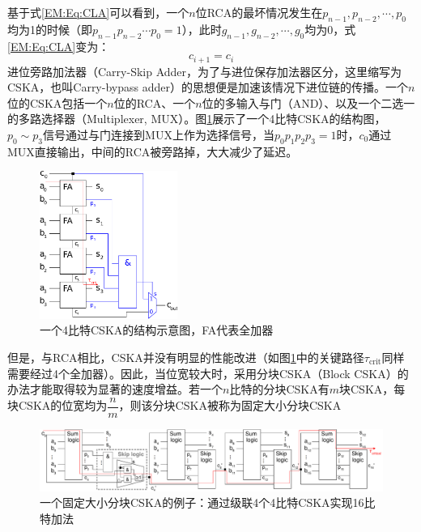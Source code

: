 基于式\eqref{EM:Eq:CLA}可以看到，一个$n$位RCA的最坏情况发生在$p_{n-1}, p_{n-2}, \cdots, p_0$均为1的时候（即$p_{n-1} p_{n-2} \cdots p_0=1$），此时$g_{n-1}, g_{n-2}, \cdots, g_0$均为0，式\eqref{EM:Eq:CLA}变为：
\begin{equation}
    c_{i+1} =  c_i
\label{EM:Eq:CSKA_prop}
\end{equation}
进位旁路加法器（Carry-Skip Adder，为了与进位保存加法器区分，这里缩写为CSKA，也叫Carry-bypass adder）的思想便是加速该情况下进位链的传播。一个$n$位的CSKA包括一个$n$位的RCA、一个$n$位的多输入与门（AND）、以及一个二选一的多路选择器（Multiplexer, MUX）。图\ref{EM:Fig:CSKA_4bit}展示了一个4比特CSKA的结构图，$p_0 \sim p_3$信号通过与门连接到MUX上作为选择信号，当$p_0 p_1 p_2 p_3=1$时，$c_0$通过MUX直接输出，中间的RCA被旁路掉，大大减少了延迟。
\begin{figure}[!htb]
    \centering
    \includegraphics[width=0.4\textwidth]{figs/EM-CSKA_4Bit.pdf}
    \caption{一个4比特CSKA的结构示意图，FA代表全加器}
\label{EM:Fig:CSKA_4bit}
\end{figure}

但是，与RCA相比，CSKA并没有明显的性能改进（如图\ref{EM:Fig:CSKA_4bit}中的关键路径$\tau_{\text{crit}}$同样需要经过4个全加器）。因此，当位宽较大时，采用分块CSKA（Block CSKA）的办法才能取得较为显著的速度增益。若一个$n$比特的分块CSKA有$m$块CSKA，每块CSKA的位宽均为$\dfrac{n}{m}$，则该分块CSKA被称为固定大小分块CSKA%
\begin{figure}[!htb]
    \centering
    \includegraphics[width=\textwidth]{figs/EM-CSKA_16Bit.pdf}
    \caption{一个固定大小分块CSKA的例子：通过级联4个4比特CSKA实现16比特加法}
\label{EM:Fig:CSKA_16bit}
\end{figure}

